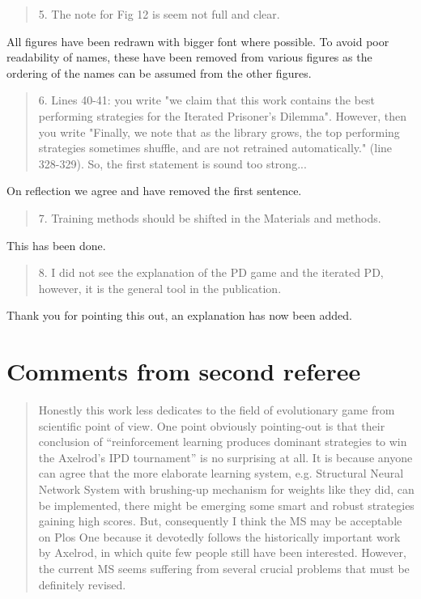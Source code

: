 \documentclass[a4]{article}
\begin{document}
\begin{quote}
    5. The note for Fig 12 is seem not full and clear.
\end{quote}

All figures have been redrawn with bigger font where possible. To avoid poor
readability of names, these have been removed from various figures as the
ordering of the names can be assumed from the other figures.

\begin{quote}
    6. Lines 40-41: you write "we claim that this work contains the best
    performing strategies for the Iterated Prisoner's Dilemma". However, then
    you write "Finally, we note that as the library grows, the top performing
    strategies sometimes shuffle, and are not retrained automatically." (line
    328-329). So, the first statement is sound too strong...
\end{quote}

On reflection we agree and have removed the first sentence.

\begin{quote}
    7. Training methods should be shifted in the Materials and methods.
\end{quote}

This has been done.

\begin{quote}
    8. I did not see the explanation of the PD game and the iterated PD,
    however, it is the general tool in the publication.
\end{quote}

Thank you for pointing this out, an explanation has now been added.

\section{Comments from second referee}

\begin{quote}
Honestly this work less dedicates to the field of evolutionary game from
scientific point of view. One point obviously pointing-out is that their
conclusion of “reinforcement learning produces dominant strategies to win the
Axelrod’s IPD tournament” is no surprising at all. It is because anyone can
agree that the more elaborate learning system, e.g. Structural Neural Network
System with brushing-up mechanism for weights like they did, can be
implemented, there might be emerging some smart and robust strategies gaining
high scores.  But, consequently I think the MS may be acceptable on Plos One
because it devotedly follows the historically important work by Axelrod, in
which quite few people still have been interested. However, the current MS
seems suffering from several crucial problems that must be definitely revised.
\end{quote}
\end{document}
